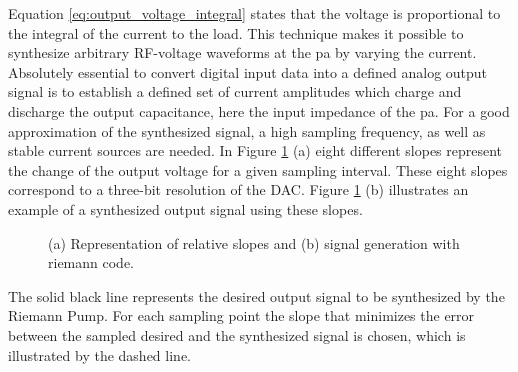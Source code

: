 \documentclass[journal]{IEEEtran}
\begin{document}
%
Equation \ref{eq:output_voltage_integral} states that the voltage is proportional to the integral of the current to the load.
This technique makes it possible to synthesize arbitrary RF-voltage waveforms at the \gls{pa} by varying the current.
Absolutely essential to convert digital input data into a defined analog output signal is to establish a defined set of current amplitudes which charge and discharge the output capacitance, here the input impedance of the \gls{pa}.
For a good approximation of the synthesized signal, a high sampling frequency, as well as stable current sources are needed.
In Figure \ref{fig:SlopeSynthSignal} (a) eight different slopes represent the change of the output voltage for a given sampling interval.
These eight slopes correspond to a three-bit resolution of the DAC. 
Figure \ref{fig:SlopeSynthSignal} (b) illustrates an example of a synthesized output signal using these slopes.
%
\begin{figure}[htb]
  \centering
	\begin{scriptsize}
  	\def\svgwidth{\columnwidth}
 	 
  	\caption{(a) Representation of relative slopes and (b) signal generation with riemann code.}
  	\label{fig:SlopeSynthSignal}
	\end{scriptsize}
\end{figure}
%
The solid black line represents the desired output signal to be synthesized by the Riemann Pump.
For each sampling point the slope that minimizes the error between the sampled desired and the synthesized signal is chosen, which is illustrated by the dashed line.
\end{document}
